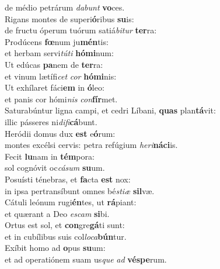 \oddverse de médio petrárum \textit{da}\textit{bunt} \textbf{vo}ces.\\
\evenverse Rigans montes de superi\textbf{ó}ribus \textbf{su}is:~\*\\
\evenverse de fructu óperum tuórum satiá\textit{bi}\textit{tur} \textbf{ter}ra:\\
\oddverse Prodúcens \textbf{fœ}num ju\textbf{mén}tis:~\*\\
\oddverse et herbam servi\textit{tú}\textit{ti} \textbf{hó}\textbf{mi}num:\\
\evenverse Ut edúcas \textbf{pa}nem de \textbf{ter}ra:~\*\\
\evenverse et vinum lætífi\textit{cet} \textit{cor} \textbf{hó}\textbf{mi}nis:\\
\oddverse Ut exhílaret fáci\textbf{em} in \textbf{ó}leo:~\*\\
\oddverse et panis cor hómi\textit{nis} \textit{con}\textbf{fír}met.\\
\evenverse Saturabúntur ligna campi, et cedri Líbani, \textbf{quas} plan\textbf{tá}vit:~\*\\
\evenverse illic pásseres ni\textit{di}\textit{fi}\textbf{cá}bunt.\\
\oddverse Heródii domus dux \textbf{est} e\textbf{ó}rum:~\*\\
\oddverse montes excélsi cervis: petra refúgium \textit{he}\textit{ri}\textbf{ná}\textbf{ci}is.\\
\evenverse Fecit \textbf{lu}nam in \textbf{tém}pora:~\*\\
\evenverse sol cognóvit oc\textit{cá}\textit{sum} \textbf{su}um.\\
\oddverse Posuísti ténebras, et \textbf{fa}cta \textbf{est} nox:~\*\\
\oddverse in ipsa pertransíbunt omnes bé\textit{sti}\textit{æ} \textbf{sil}væ.\\
\evenverse Cátuli leónum rugi\textbf{én}tes, ut \textbf{rá}piant:~\*\\
\evenverse et quærant a Deo \textit{e}\textit{scam} \textbf{si}bi.\\
\oddverse Ortus est sol, et \textbf{con}gre\textbf{gá}ti sunt:~\*\\
\oddverse et in cubílibus suis col\textit{lo}\textit{ca}\textbf{bún}tur.\\
\evenverse Exíbit homo ad \textbf{o}pus \textbf{su}um:~\*\\
\evenverse et ad operatiónem suam us\textit{que} \textit{ad} \textbf{vé}\textbf{spe}rum.\\
